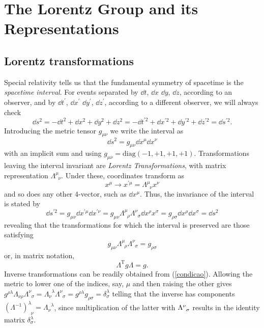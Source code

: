 \chapter{The Lorentz Group and its Representations}
\section{Lorentz transformations}
Special relativity tells us  that the fundamental symmetry of spacetime is the \textit{spacetime interval}. For events separated by $\dd t$, $\dd x$ $\dd y$, $\dd z$, according to an observer, and by $\dd t^\prime$, $\dd x^\prime$ $\dd y^\prime$, $\dd z^\prime$, according to a different observer, we will always check
\begin{equation}
    \dd s^2 =  -\dd t^{2}+ \dd x^{2}+ \dd y^{ 2}+\dd z^{2} =-\dd t^{\prime 2}+ \dd x^{\prime2}+ \dd y^{\prime 2}+\dd z^{\prime2}=\dd s^{\prime2}.
\end{equation}
Introducing the metric tensor $g_{\mu\nu}$ we write the interval as
\begin{equation}
    \dd s^2=g_{\mu\nu}\dd x^\mu\dd x^\nu
\end{equation}
with an implicit sum and using $g_{\mu\nu}=\text{diag}(-1,+1,+1,+1)$. Transformations leaving the interval invariant are \textit{Lorentz Transformations}, with matrix representation $\Lambda^\mu_{\phantom{a}\nu}$. Under these, coordinates transform as 
\begin{equation}
    x^\mu\to x^{\prime\mu}=\Lambda^\mu_{\phantom{a}\nu} x^\nu
\end{equation}
and so does any other 4-vector, such as $\dd x^\mu$. Thus, the invariance of the interval is stated by
\begin{equation}
    \dd s^{\prime2}=g_{\mu\nu}\dd x^{\prime\mu}\dd x^{\prime\nu}=g_{\mu\nu}\Lambda^\mu_{\phantom{a}\rho} \Lambda^\nu_{\phantom{a}\sigma}\dd x^\rho x^\sigma= 
    g_{\rho\sigma}\dd x^\rho\dd x^\sigma=\dd s^2
\end{equation}
revealing that the transformations for which the interval is preserved are those satisfying
\begin{equation}
    g_{\mu\nu}\Lambda^\mu_{\phantom{a}\rho} \Lambda^\nu_{\phantom{a}\sigma}=
    g_{\rho\sigma}
    \label{condicao}
\end{equation}
or, in matrix notation,
\begin{equation}
    \Lambda^{\text{T}}g\Lambda=g.
    \label{condicao_matriz}
\end{equation}
Inverse transformations can be readily obtained from (\ref{condicao}). Allowing the metric to lower one of the indices, say, $\mu$ and then raising the other gives $g^{\rho\lambda}\Lambda_{\nu\rho}\Lambda^\nu_{\phantom{a}\sigma}=\Lambda_\nu^{\phantom{a}\lambda}\Lambda^\nu_{\phantom{a}\sigma}=g^{\rho\lambda}g_{\rho\sigma}=\delta^\lambda_\sigma$ telling that the inverse has components $(\Lambda^{-1})^\lambda_{\phantom{a}\nu}=\Lambda_\nu^{\phantom{a}\lambda}$, since multiplication of the latter with $\ten{\Lambda}{\nu}{\sigma}$ results in the identity matrix $\delta^\lambda_\sigma$.\\


